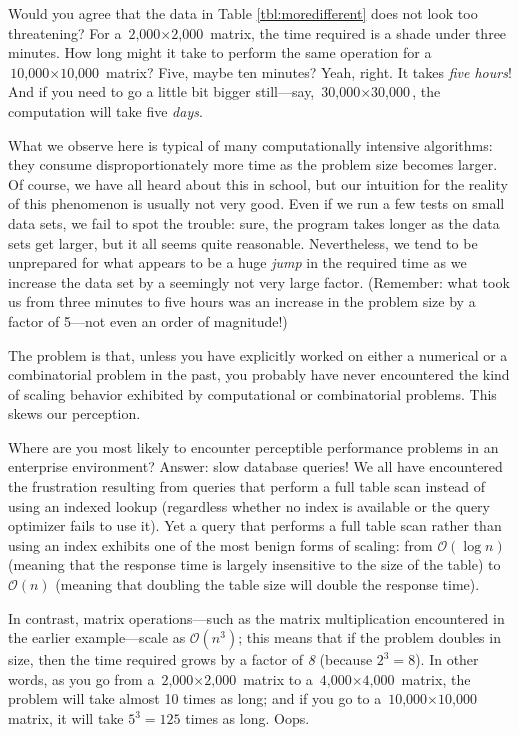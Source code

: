 Would you agree that the data in Table \ref{tbl:moredifferent} does
not look too threatening? For a $\text{2,000} \times \text{2,000}$
matrix, the time required is a shade under three minutes. How long
might it take to perform the same operation for a $\text{10,000}
\times \text{10,000}$ matrix? Five, maybe ten minutes? Yeah, right. It
takes \emph{five hours}! And if you need to go a little bit bigger
still---say, $\text{30,000} \times \text{30,000}$, the computation
will take five \emph{days}.

What we observe here is typical of many computationally intensive
algorithms: they consume disproportionately more time as the problem
size becomes larger. Of course, we have all heard about this in school,
but our intuition for the reality of this phenomenon is usually not
very good. Even if we run a few tests on small data sets, we fail to
spot the trouble: sure, the program takes longer as the data sets get
larger, but it all seems quite reasonable. Nevertheless, we tend to be
unprepared for what appears to be a huge \emph{jump} in the required
time as we increase the data set by a seemingly not very large factor.
(Remember: what took us from three minutes to five hours was an
increase in the problem size by a factor of 5---not even an order
of magnitude!)

The problem is that, unless you have explicitly worked on either a
numerical or a combinatorial problem in the past, you probably have
never encountered the kind of scaling behavior exhibited by
computational or combinatorial problems. This skews our perception.

Where are you most likely to encounter perceptible performance
problems in an enterprise environment? Answer: slow database queries!
We all have encountered the frustration resulting from queries that
perform a full table scan instead of using an indexed lookup
(regardless whether no index is available or the query optimizer fails
to use it). Yet a query that performs a full table scan rather than
using an index exhibits one of the most benign forms of scaling: from
$\mathcal{O}(\log n)$ (meaning that the response time is largely
insensitive to the size of the table) to $\mathcal{O}(n)$ (meaning
that doubling the table size will double the response time).

In contrast, matrix operations---such as the matrix multiplication
encountered in the earlier example---scale as $\mathcal{O}(n^3)$; this
means that if the problem doubles in size, then the time required
grows by a factor of \emph{8} (because $2^3 = 8$). In other words,
as you go from a $\text{2,000} \times \text{2,000}$ matrix to a
$\text{4,000} \times \text{4,000}$ matrix, the problem will take
almost 10 times as long; and if you go to a $\text{10,000} \times
\text{10,000}$ matrix, it will take $5^3 = 125$ times as long. Oops.

